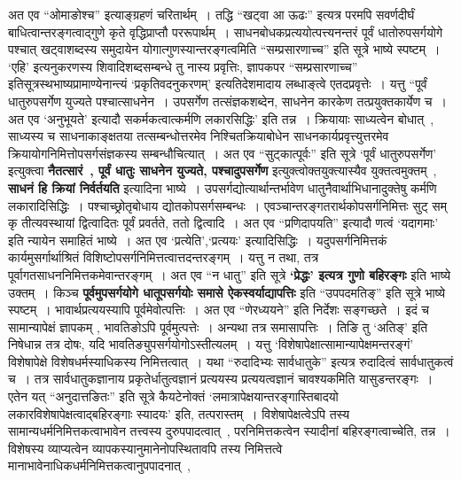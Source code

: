 अत एव ``ओमाङोश्च'' इत्याङ्ग्रहणं चरितार्थम्~।
तद्धि ``खट्वा आ ऊढः'' इत्यत्र परमपि सवर्णदीर्घं बाधित्वान्तरङ्गत्वाद्गुणे कृते वृद्धिप्राप्तौ पररूपार्थम्~।
साधनबोधकप्रत्ययोत्पत्त्यनन्तरं पूर्वं धातोरुपसर्गयोगे पश्चात् खट्वाशब्दस्य समुदायेन योगात्गुणस्यान्तरङ्गत्वमिति ``सम्प्रसारणाच्च'' इति सूत्रे भाष्ये स्पष्टम्~।
`एहि' इत्यनुकरणस्य शिवादिशब्दसम्बन्धे तु नास्य प्रवृत्तिः, ज्ञापकपर ``सम्प्रसारणाच्च'' इतिसूत्रस्थभाष्यप्रामाण्येनान्त्यं `प्रकृतिवदनुकरणम्' इत्यतिदेशमादाय लब्धाङ्‍त्वे एतदप्रवृत्तेः~।
यत्तु ``पूर्वं धातुरुपसर्गेण युज्यते पश्चात्साधनेन~।
उपसर्गेण तत्संज्ञकशब्देन, साधनेन कारकेण तत्प्रयुक्तकार्येण च~।
अत एव `अनुभूयते' इत्यादौ सकर्मकत्वात्कर्मणि लकारसिद्धिः' इति तन्न~।
क्रियायाः साध्यत्वेन बोधात्~, साध्यस्य च साधनाकाङ्क्षतया तत्सम्बन्धोत्तरमेव निश्चितक्रियाबोधेन साधनकार्यप्रवृत्त्युत्तरमेव क्रियायोगनिमित्तोपसर्गसंज्ञकस्य सम्बन्धौचित्यात्~।
अत एव ``सुट्‍कात्पूर्वः'' इति सूत्रे `पूर्वं धातुरुपसर्गेण' इत्युक्त्वा {\bfseries नैतत्सारं~, पूर्वं धातुः साधनेन युज्यते, पश्चादुपसर्गेण} इत्युक्त्वोक्तयुक्त्यास्यैव युक्तत्वमुक्तम्~, {\bfseries साधनं हि क्रियां निर्वर्तयति} इत्यादिना भाष्ये~।
उपसर्गद्योत्यार्थान्तर्भावेण धातुनैवार्थाभिधानादुक्तेषु कर्मणि लकारादिसिद्धिः~।
पश्चाच्छ्रोतृबोधाय द्योतकोपसर्गसम्बन्धः~।
एवञ्चान्तरङ्गतरार्थकोपसर्गनिमित्तः सुट् सम् कृ तीत्यवस्थायां द्वित्वादितः पूर्वं प्रवर्तते, ततो द्वित्वादि~।
अत एव ``प्रणिदापयति'' इत्यादौ णत्वं `यदागमाः' इति न्यायेन समाहितं भाष्ये~।
अत एव `प्रत्येति',`प्रत्ययः' इत्यादिसिद्धिः~।
यदुपसर्गनिमित्तकं कार्यमुसर्गार्थाश्रितं विशिष्टोपसर्गनिमित्तत्वात्तदन्तरङ्गम्~।
यत्तु न तथा, तत्र पूर्वागतसाधननिमित्तकमेवान्तरङ्गम्~।
अत एव ``न धातु'' इति सूत्रे {\bfseries `प्रेद्धः' इत्यत्र गुणो बहिरङ्गः} इति भाष्ये उक्तम्~।
किञ्च {\bfseries पूर्वमुपसर्गयोगे धातूपसर्गयोः समासे ऐकस्वर्याद्यापत्तिः} इति ``उपपदमतिङ्'' इति सूत्रे भाष्ये स्पष्टम्~।
भावार्थप्रत्ययस्यापि पूर्वमेवोत्पत्तिः~।
अत एव ``णेरध्ययने'' इति निर्देशः सङ्गच्छते~।
इदं च सामान्यापेक्षं ज्ञापकम् , भावतिङोऽपि पूर्वमुत्पत्तेः~।
अन्यथा तत्र समासापत्तिः~।
तिङि तु `अतिङ्' इति निषेधान्न तत्र दोषः, यदि भावतिङ्युपसर्गयोगोऽस्तीत्यलम्~।
यत्तु `विशेषापेक्षात्सामान्यापेक्षमन्तरङ्गं' विशेषापेक्षे विशेषधर्मस्याधिकस्य निमित्तत्वात्~।
यथा ``रुदादिभ्यः सार्वधातुके'' इत्यत्र रुदादित्वं सार्वधातुकत्वं च~।
तत्र सार्वधातुकज्ञानाय प्रकृतेर्धातुत्वज्ञानं प्रत्ययस्य प्रत्ययत्वज्ञानं चावश्यकमिति यासुडन्तरङ्गः~।
एतेन यत् ``अनुदात्तङितः'' इति सूत्रे कैयटेनोक्तं `लमात्रापेक्षयान्तरङ्गास्तिबादयो लकारविशेषापेक्षत्वाद्बहिरङ्गाः स्यादयः' इति, तत्परास्तम्~।
विशेषापेक्षत्वेऽपि तस्य सामान्यधर्मनिमित्तकत्वाभावेन तत्त्वस्य दुरुपपादत्वात्~, परनिमित्तकत्वेन स्यादीनां बहिरङ्गत्वाच्चेति, तन्न~।
विशेषस्य व्याप्यत्वेन व्यापकस्यानुमानेनोपस्थितावपि तस्य निमित्तत्वे मानाभावेनाधिकधर्मनिमित्तकत्वानुपपादनात्~,
